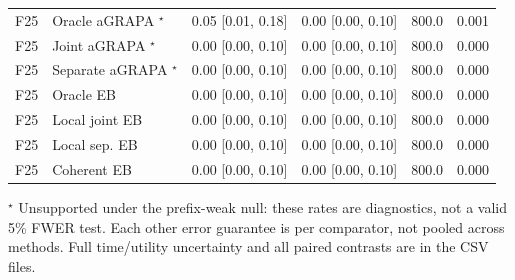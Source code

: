 \begin{longtable}{llrrrr}
F25 & Oracle aGRAPA $^{\star}$ & 0.05 [0.01, 0.18] & 0.00 [0.00, 0.10] & 800.0 & 0.001\\
F25 & Joint aGRAPA $^{\star}$ & 0.00 [0.00, 0.10] & 0.00 [0.00, 0.10] & 800.0 & 0.000\\
F25 & Separate aGRAPA $^{\star}$ & 0.00 [0.00, 0.10] & 0.00 [0.00, 0.10] & 800.0 & 0.000\\
F25 & Oracle EB & 0.00 [0.00, 0.10] & 0.00 [0.00, 0.10] & 800.0 & 0.000\\
F25 & Local joint EB & 0.00 [0.00, 0.10] & 0.00 [0.00, 0.10] & 800.0 & 0.000\\
F25 & Local sep. EB & 0.00 [0.00, 0.10] & 0.00 [0.00, 0.10] & 800.0 & 0.000\\
F25 & Coherent EB & 0.00 [0.00, 0.10] & 0.00 [0.00, 0.10] & 800.0 & 0.000\\
\bottomrule\end{longtable}
$^{\star}$ Unsupported under the prefix-weak null: these rates are diagnostics, not a valid 5\% FWER test. Each other error guarantee is per comparator, not pooled across methods. Full time/utility uncertainty and all paired contrasts are in the CSV files.
\endgroup
